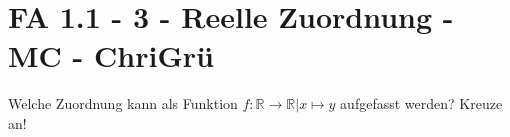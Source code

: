 \section{FA 1.1 - 3 - Reelle Zuordnung - MC - ChriGrü}

\begin{beispiel}[FA 1.1]{1} %
Welche Zuordnung kann als Funktion $f: \mathbb{R} \rightarrow \mathbb{R} | x\mapsto y$ aufgefasst werden? Kreuze an!			
\end{beispiel}